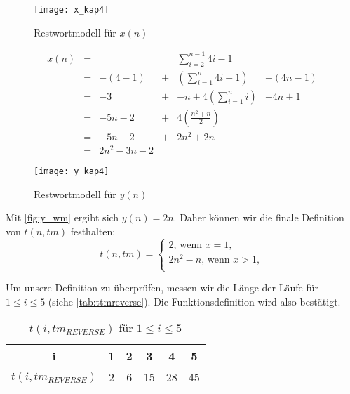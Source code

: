\begin{figure}[hb]
    \caption{Restwortmodell für $x(n)$}
    \centering
    \texttt{[image: x\_kap4]}%
    \label{fig:x_wm}
\end{figure}



\begin{align*}
    x(n) &=&                &   & \sum_{i=2}^{n-1} 4i - 1     &            \\ 
         &=& -(4 - 1)       & + & (\sum_{i=1}^{n} 4i -1)      & - (4n - 1) \\
         &=& -3             & + & -n + 4 (\sum_{i=1}^{n} i)   &  - 4n + 1  \\
         &=& -5n -2         & + & 4 (\frac{n^2+n}{2})         &            \\
         &=& -5n -2         & + & 2 n^2 + 2n                  &            \\
         &=& 2n^2 -3n -2    &   &                             &            
\end{align*}


\begin{figure}[hb]
    \caption{Restwortmodell für $y(n)$}
    \centering
    \texttt{[image: y\_kap4]}%
    \label{fig:y_wm}
\end{figure}
Mit \autoref{fig:y_wm} ergibt sich $y(n) = 2n$.
Daher können wir die finale Definition von $t(n, tm)$ festhalten:
\[
    t(n, tm) = \begin{cases}
        2\text{, wenn } x = 1,\\
        2 n^2 -n \text{, wenn } x > 1,\\
    \end{cases}
\]

Um unsere Definition zu überprüfen, messen wir die Länge der Läufe für  $1 \leq i \leq 5$
(siehe \autoref{tab:ttmreverse}).
Die Funktionsdefinition wird also bestätigt.
\begin{table}[ht]
    \caption{$t(i,tm_{REVERSE})$ für $1 \leq i \leq 5$}
    \centering
    \begin{tabular}{c c c c c c}
    \toprule
          i
        & 1
        & 2
        & 3
        & 4
        & 5
        \\
        \midrule
          $t(i,tm_{REVERSE})$
        & 2
        & 6
        & 15
        & 28
        & 45
        \\
    \bottomrule
    \end{tabular}%
    \label{tab:ttmreverse}
\end{table}


